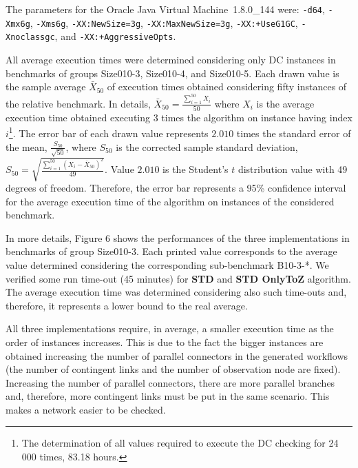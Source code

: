 \documentclass[a4paper,11pt]{article}
\begin{document}
The parameters for the Oracle Java Virtual Machine~1.8.0\_144 were: \texttt{-d64}, \texttt{-Xmx6g}, \texttt{-Xms6g}, \texttt{-XX:NewSize=3g}, \texttt{-XX:MaxNewSize=3g}, \texttt{-XX:+UseG1GC}, \texttt{-Xnoclassgc}, and \texttt{-XX:+AggressiveOpts}.

All average execution times were determined considering only DC instances in benchmarks of groups Size010-3, Size010-4, and Size010-5.
Each drawn value is the sample average $\bar{X}_{50}$ of execution times obtained considering fifty instances of the relative benchmark.
In details, $\bar{X}_{50}=\frac{\sum_{i=1}^{50} X_i}{50}$ where $X_i$ is the average execution time obtained executing 3 times the algorithm on instance having index $i$\footnote{The determination of all values required to execute the DC checking for 24 000 times, 83.18 hours.}.
The error bar of each drawn value represents $2.010$ times the standard error of the mean, $\frac{S_{50}}{\sqrt{50}}$, where $S_{50}$ is the corrected sample standard deviation, $S_{50}= \sqrt{\frac{\sum_{i=1}^{50} (X_i-\bar{X}_{50})^2}{49}}$. Value $2.010$ is the Student's $t$ distribution value with 49 degrees of freedom.
Therefore, the error bar represents a 95\% confidence interval for the average execution time of the algorithm on instances of the considered benchmark.

In more details, Figure 6 shows the performances of the three implementations in benchmarks of group Size010-3.
Each printed value corresponds to the average value determined considering the corresponding sub-benchmark B10-3-*.
We verified some run time-out (45 minutes) for \textbf{STD} and \textbf{STD OnlyToZ} algorithm.
The average execution time was determined considering also such time-outs and, therefore, it represents a lower bound to the real average.

All three implementations require, in average, a smaller execution time as the order of instances increases.
This is due to the fact the bigger instances are obtained increasing the number of parallel connectors in the generated workflows (the number of contingent links and the number of observation node are fixed). Increasing the number of parallel connectors, there are more parallel branches and, therefore, more contingent links must be put in the same scenario.
This makes a network easier to be checked.
\end{document}
